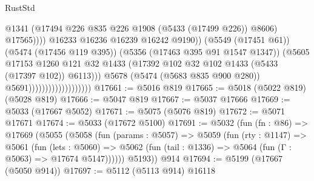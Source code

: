 \begin{lexlean}{RustStd}
\begin{coremodule}
                                                        @1341
                                                        (@17494
                                                          @226
                                                          @835
                                                          @226
                                                          @1908
                                                          (@5433 (@17499 @226))
                                                          @8606)
                                                        @17565))))
                                                @16233
                                                @16236
                                                @16239
                                                @16242
                                                @9190))
                                            (@5549 (@17451 @61))
                                            (@5474 (@17456 @119 @395))
                                            (@5356 (@17463 @395 @91 @1547 @1347))
                                            (@5605
                                              @17153
                                              @1260
                                              @121
                                              @32
                                              @1433
                                              (@17392
                                                @102
                                                @32
                                                @102
                                                @1433
                                                (@5433 (@17397 @102))
                                                @6113)))
                                          @5678
                                          (@5474 (@5683 @835 @900 @280))
                                          @5691)))))))))))))))))))
@17661 := @5016 @819
@17665 := @5018 (@5022 @819) (@5028 @819)
@17666 := @5047 @819
@17667 := @5037 @17666
@17669 := @5033 (@17667 @5052)
@17671 := @5075 (@5076 @819)
@17672 := @5071 @17671
@17674 := @5033 (@17672 @5100)
@17691 := @5032
    (fun (fn : @86) =>
    @17669
      (@5055
        (@5058
          (fun (params : @5057) =>
          @5059
            (fun (rty : @1147) =>
            @5061
              (fun (lets : @5060) =>
              @5062 (fun (tail : @1336) => @5064 (fun (Γ : @5063) => @17674 @5147))))))
        @5193))
    @914
@17694 := @5199 (@17667 (@5050 @914))
@17697 := @5112 (@5113 @914) @16118

\end{coremodule}
\end{lexlean}
